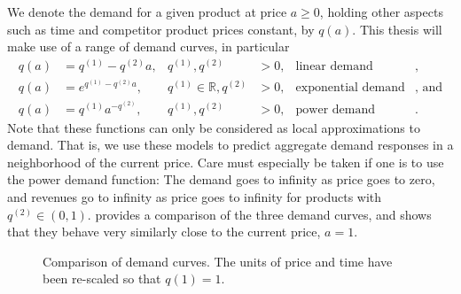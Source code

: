 \documentclass[main.tex]{subfiles}
\begin{document}
We denote the demand for a given product at price $a\geq 0$, holding
other aspects such as time and competitor product prices constant, by $q(a)$.
This thesis will make use of a range of demand curves, in particular
\begin{align}\label{eq:demand_fun_lin}
  q(a) &= q^{(1)}-q^{(2)}a,&q^{(1)},q^{(2)}&>0,&\text{linear demand}&,\\
  q(a) &= e^{q^{(1)}-q^{(2)}a},&q^{(1)}\in\mathbb{R},q^{(2)}&>0,&\text{exponential
                                                                  demand}&\text{, and}\\
  q(a) &= q^{(1)}a^{-q^{(2)}},&q^{(1)},q^{(2)}&>0,&\text{power demand}&.\label{eq:demand_fun_pow}
\end{align}
Note that these functions can only be considered as local
approximations to demand. That is, we use these models to predict
aggregate demand responses in a neighborhood of the current
price. Care must especially be taken if one is to use the power demand
function: The demand goes to infinity as price goes to zero, and
revenues go to infinity as price goes to infinity for products with $q^{(2)}\in(0,1)$.
 provides a comparison of the three
demand curves, and shows that they behave very similarly close to the
current price, $a=1$.
\begin{figure}[htbp]
  \centering
  \caption[Comparison of demand curves.]{Comparison of demand curves. The units of price and time
    have been re-scaled so that $q(1)=1$.}\label{fig:demandfun_comparison}
\end{figure}
\end{document}
